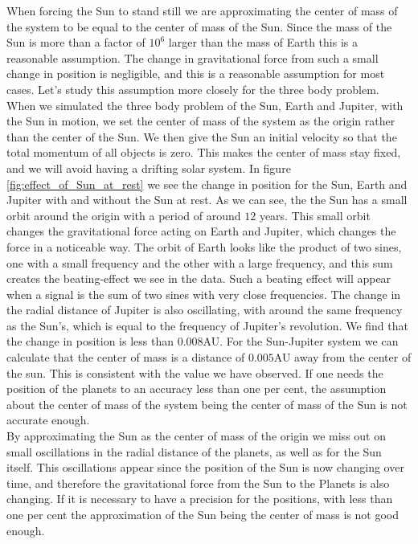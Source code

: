 \documentclass[%
 reprint,
nofootinbib,
aps,
]{revtex4-1}
\begin{document}
When forcing the Sun to stand still we are approximating the center of mass of the system to be equal to the center of mass of the Sun. Since the mass of the Sun is more than a factor of $10^6$ larger than the mass of Earth this is a reasonable assumption. The change in gravitational force from such a small change in position is negligible, and this is a reasonable assumption for most cases. Let's study this assumption more closely for the three body problem.\\
When we simulated the three body problem of the Sun, Earth and Jupiter, with the Sun in motion, we set the center of mass of the system as the origin rather than the center of the Sun. We then give the Sun an initial velocity so that the total momentum of all objects is zero. This makes the center of mass stay fixed, and we will avoid having a drifting solar system. In figure \vref{fig:effect_of_Sun_at_rest} we see the change in position for the Sun, Earth and Jupiter with and without the Sun at rest. As we can see, the the Sun has a small orbit around the origin with a period of around $12$ years. This small orbit changes the gravitational force acting on Earth and Jupiter, which changes the force in a noticeable way. The orbit of Earth looks like the product of two sines, one with a small frequency and the other with a large frequency, and this sum creates the beating-effect we see in the data. Such a beating effect will appear when a signal is the sum of two sines with very close frequencies. The change in the radial distance of Jupiter is also oscillating, with around the same frequency as the Sun's, which is equal to the frequency of Jupiter's revolution. We find that the change in position is less than $0.008$AU. For the Sun-Jupiter system we can calculate that the center of mass is a distance of $0.005$AU away from the center of the sun. This is consistent with the value we have observed. If one needs the position of the planets to an accuracy less than one per cent, the assumption about the center of mass of the system being the center of mass of the Sun is not accurate enough.\\By approximating the Sun as the center of mass of the origin we miss out on small oscillations in the radial distance of the planets, as well as for the Sun itself. This oscillations appear since the position of the Sun is now changing over time, and therefore the gravitational force from the Sun to the Planets is also changing. If it is necessary to have a precision for the positions, with less than one per cent the approximation of the Sun being the center of mass is not good enough.
\end{document}
